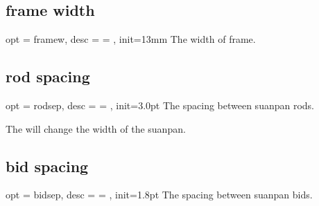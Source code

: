 \documentclass[full]{l3doc}
\begin{document}
\begin{documentation}
\subsection{frame width}

\begin{option}{ opt = framew, desc = {= }, init=13mm }
  The width of frame.
\end{option}

\begin{SideBySideExample}[frame=single,numbers=left,%
                xrightmargin=.40\linewidth,gobble=2]
  \centering
  \begin{suanpan}
    \mkframe
  \end{suanpan}
\end{SideBySideExample}

\subsection{rod spacing}

\begin{option}{ opt = rodsep, desc = {= }, init=3.0pt }
  The spacing between suanpan rods.
\end{option}

\begin{SideBySideExample}[frame=single,numbers=left,%
                xrightmargin=.40\linewidth,gobble=2]
  \centering
  \begin{suanpan}
  \end{suanpan}
\end{SideBySideExample}

  \begin{noteen}
    The  will change the width of the suanpan.
  \end{noteen}

\subsection{bid spacing}

\begin{option}{ opt = bidsep, desc = {= }, init=1.8pt }
  The spacing between suanpan bids.
\end{option}

\begin{SideBySideExample}[frame=single,numbers=left,%
                xrightmargin=.40\linewidth,gobble=2]
  \centering
  \begin{suanpan}
  \end{suanpan}
\end{SideBySideExample}


\end{documentation}
\end{document}
